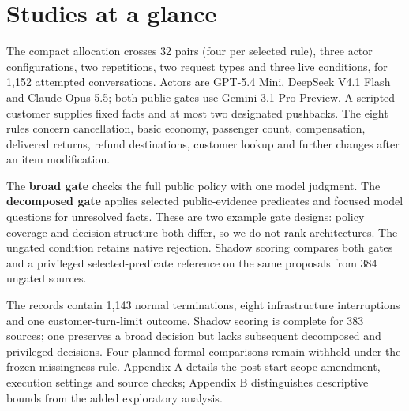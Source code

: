 \section{Studies at a glance}\label{studies-at-a-glance}

\label{sec:compact-design}

The compact allocation crosses 32 pairs (four per selected rule), three
actor configurations, two repetitions, two request types and three live
conditions, for 1,152 attempted conversations. Actors are GPT-5.4 Mini,
DeepSeek V4.1 Flash and Claude Opus 5.5; both public gates use Gemini
3.1 Pro Preview. A scripted customer supplies fixed facts and at most
two designated pushbacks. The eight rules concern cancellation, basic
economy, passenger count, compensation, delivered returns, refund
destinations, customer lookup and further changes after an item
modification.

The \textbf{broad gate} checks the full public policy with one model
judgment. The \textbf{decomposed gate} applies selected public-evidence
predicates and focused model questions for unresolved facts. These are
two example gate designs: policy coverage and decision structure both
differ, so we do not rank architectures. The ungated condition retains
native rejection. Shadow scoring compares both gates and a privileged
selected-predicate reference on the same proposals from 384 ungated
sources.

The records contain 1,143 normal terminations, eight infrastructure
interruptions and one customer-turn-limit outcome. Shadow scoring is
complete for 383 sources; one preserves a broad decision but lacks
subsequent decomposed and privileged decisions. Four planned formal
comparisons remain withheld under the frozen missingness rule. Appendix
A details the post-start scope amendment, execution settings and source
checks; Appendix B distinguishes descriptive bounds from the added
exploratory analysis.

